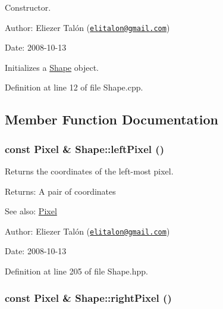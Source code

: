 Constructor. 

\begin{Desc}
\item[Author:]Eliezer Talón (\href{mailto:elitalon@gmail.com}{\tt elitalon@gmail.com}) \end{Desc}
\begin{Desc}
\item[Date:]2008-10-13\end{Desc}
Initializes a \hyperlink{class_shape}{Shape} object. 

Definition at line 12 of file Shape.cpp.

\subsection{Member Function Documentation}
\hypertarget{class_shape_2459925c87fd67a5fe3baf25f0ff41d3}{
\subsubsection[leftPixel]{\setlength{\rightskip}{0pt plus 5cm}const {\bf Pixel} \& Shape::leftPixel ()}}
\label{class_shape_2459925c87fd67a5fe3baf25f0ff41d3}


Returns the coordinates of the left-most pixel. 

\begin{Desc}
\item[Returns:]A pair of coordinates\end{Desc}
\begin{Desc}
\item[See also:]\hyperlink{_pixel_8hpp_535e59456e3e633842529cfa8ea103c4}{Pixel}\end{Desc}
\begin{Desc}
\item[Author:]Eliezer Talón (\href{mailto:elitalon@gmail.com}{\tt elitalon@gmail.com}) \end{Desc}
\begin{Desc}
\item[Date:]2008-10-13 \end{Desc}


Definition at line 205 of file Shape.hpp.\hypertarget{class_shape_86841a53f5d82ba696406ef29f908d4f}{
\subsubsection[rightPixel]{\setlength{\rightskip}{0pt plus 5cm}const {\bf Pixel} \& Shape::rightPixel ()}}
\label{class_shape_86841a53f5d82ba696406ef29f908d4f}


